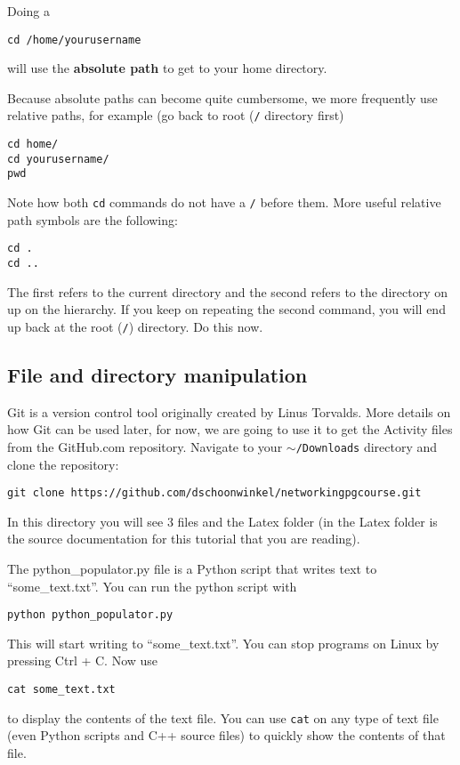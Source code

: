 \documentclass[a4paper]{article}
\begin{document}
Doing a 
\begin{lstlisting}
cd /home/yourusername
\end{lstlisting}
will use the \textbf{absolute path} to get to your home directory.


Because absolute paths can become quite cumbersome, we more frequently use relative paths, for example (go back to root (\texttt{/} directory first)
\begin{lstlisting}
cd home/
cd yourusername/
pwd
\end{lstlisting}
Note how both \texttt{cd} commands do not have a \texttt{/} before them.
More useful relative path symbols are the following:
\begin{lstlisting}
cd .
cd ..
\end{lstlisting}
The first refers to the current directory and the second refers to the directory on up on the hierarchy. If you keep on repeating the second command, you will end up back at the root (\texttt{/}) directory. Do this now.

\subsection{File and directory manipulation}
Git is a version control tool originally created by Linus Torvalds. More details on how Git can be used later, for now, we are going to use it to get the Activity files from the GitHub.com repository. Navigate to your \texttt{$\sim$/Downloads} directory and clone the repository: 
\begin{lstlisting}
git clone https://github.com/dschoonwinkel/networkingpgcourse.git
\end{lstlisting}

In this directory you will see 3 files and the Latex folder (in the Latex folder is the source documentation for this tutorial that you are reading). 


The python\_populator.py file is a Python script that writes text to ``some\_text.txt''. You can run the python script with 
\begin{lstlisting}
python python_populator.py
\end{lstlisting}
This will start writing to ``some\_text.txt''. You can stop programs on Linux by pressing Ctrl + C. Now use 
\begin{lstlisting}
cat some_text.txt
\end{lstlisting} 
to display the contents of the text file. You can use \texttt{cat} on any type of text file (even Python scripts and C++ source files) to quickly show the contents of that file. 
\end{document}
